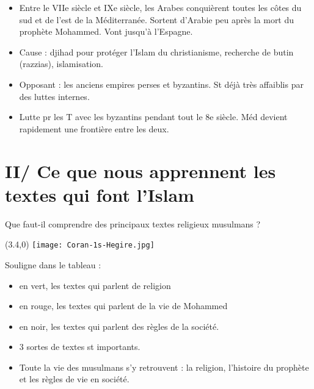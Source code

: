 \documentclass{beamer}
\begin{document}
\begin{frame}


\begin{itemize}
\item Entre le VIIe siècle et IXe siècle, les Arabes conquièrent toutes les côtes du sud et de l'est de la Méditerranée. Sortent d'Arabie peu après la mort du prophète Mohammed. Vont jusqu'à l'Espagne. 
\item Cause : djihad pour protéger l'Islam du christianisme, recherche de butin (razzias), islamisation.
\item Opposant : les anciens empires perses et byzantins. St déjà très affaiblis par des luttes internes. 
\item Lutte pr les T avec les byzantins pendant tout le 8e siècle. Méd devient rapidement une frontière entre les deux.

\end{itemize}



\end{frame}

\section{II/ Ce que nous apprennent les textes qui font l'Islam}

\begin{frame}{Que faut-il comprendre des principaux textes religieux musulmans ?}

\begin{textblock}{3}(3.4,0)
\texttt{[image: Coran-1s-Hegire.jpg]}
\end{textblock}

Souligne dans le tableau : 
\begin{itemize}
\item en vert, les textes qui parlent de religion
\item en rouge, les textes qui parlent de la vie de Mohammed
\item en noir, les textes qui parlent des règles de la société.
\end{itemize}
\end{frame}


\begin{frame}
\begin{itemize}
\item 3 sortes de textes st importants.
\item Toute la vie des musulmans s'y retrouvent : la religion, l'histoire du prophète et les règles de vie en société.
\end{itemize}

\end{frame}
\end{document}
